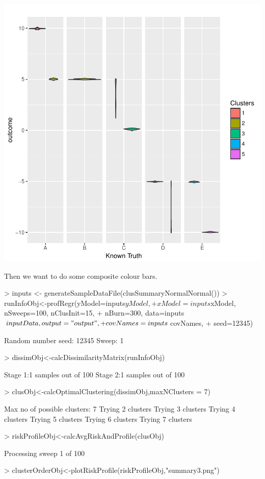 \documentclass{article}
\begin{document}
\includegraphics{Fig-test3}

Then we want to do some composite colour bars. 
\begin{Schunk}
\begin{Sinput}
> inputs <- generateSampleDataFile(clusSummaryNormalNormal())
> runInfoObj<-profRegr(yModel=inputs$yModel, 
+     xModel=inputs$xModel, nSweeps=100, nClusInit=15,
+     nBurn=300, data=inputs$inputData, output="output", 
+     covNames = inputs$covNames, 
+     seed=12345)
\end{Sinput}
\begin{Soutput}
Random number seed: 12345
Sweep: 1
\end{Soutput}
\begin{Sinput}
> dissimObj<-calcDissimilarityMatrix(runInfoObj)
\end{Sinput}
\begin{Soutput}
Stage 1:1 samples out of 100
Stage 2:1 samples out of 100
\end{Soutput}
\begin{Sinput}
> clusObj<-calcOptimalClustering(dissimObj,maxNClusters = 7)
\end{Sinput}
\begin{Soutput}
Max no of possible clusters: 7 
Trying 2 clusters
Trying 3 clusters
Trying 4 clusters
Trying 5 clusters
Trying 6 clusters
Trying 7 clusters
\end{Soutput}
\begin{Sinput}
> riskProfileObj<-calcAvgRiskAndProfile(clusObj)
\end{Sinput}
\begin{Soutput}
Processing sweep 1 of  100 
\end{Soutput}
\begin{Sinput}
> clusterOrderObj<-plotRiskProfile(riskProfileObj,"summary3.png")
\end{Sinput}
\end{Schunk}
\end{document}
